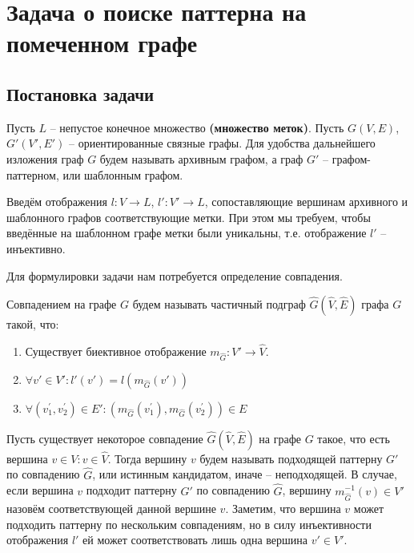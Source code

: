 \section{Задача о поиске паттерна на помеченном графе}

\subsection{Постановка задачи}
\par Пусть $L$ -- непустое конечное множество \textbf{(множество меток)}. Пусть $G(V, E)$, $G'(V', E')$ -- ориентированные связные графы. Для удобства дальнейшего изложения граф $G$ будем называть архивным графом, а граф $G'$ -- графом-паттерном, или шаблонным графом.

Введём отображения $l : V \to L$, $l' : V' \to L$, сопоставляющие вершинам архивного и шаблонного графов соответствующие метки. При этом мы требуем, чтобы введённые на шаблонном графе метки были уникальны, т.е. отображение $l'$ -- инъективно. 

Для формулировки задачи нам потребуется определение совпадения.

\begin{defn}
	Совпадением на графе $G$ будем называть частичный подграф $\widehat{G}(\widehat{V}, \widehat{E})$ графа $G$ такой, что:
	\begin{enumerate}
		\item Существует биективное отображение $m_{\widehat{G}}: V' \to \widehat{V}$.
		\item $\forall v' \in V': l'(v') = l(m_{\widehat{G}}(v'))$
		\item $\forall (v^{\prime}_1, v^{\prime}_2) \in E': (m_{\widehat{G}}(v^{\prime}_1), m_{\widehat{G}}(v^{\prime}_2)) \in E$
	\end{enumerate}
\end{defn} 

Пусть существует некоторое совпадение  $\widehat{G}(\widehat{V}, \widehat{E})$ на графе $G$ такое, что есть вершина $v \in V : v \in \widehat{V}$. Тогда вершину $v$ будем называть подходящей паттерну $G'$ по совпадению $\widehat{G}$, или истинным кандидатом, иначе -- неподходящей. В случае, если вершина $v$ подходит паттерну $G'$ по совпадению $\widehat{G}$, вершину $m_{\widehat{G}}^{-1}(v) \in  V'$ назовём соответствующей данной вершине $v$. Заметим, что вершина $v$ может подходить паттерну по нескольким совпадениям, но в силу инъективности отображения $l'$ ей может соответствовать лишь одна вершина $v' \in  V'$.

